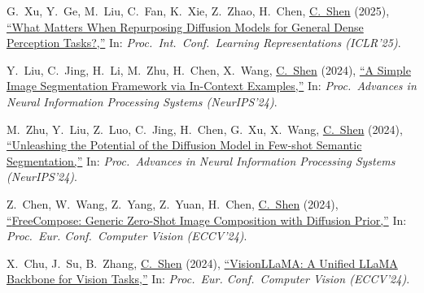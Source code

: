 \documentclass[9pt, a4paper]{article}
\newcommand{\years}[1]{\marginnote{\scriptsize #1}}
\def\highlight{\uline}
\begin{document}
\medskip

\years{2025} G.~Xu, Y.~Ge, M.~Liu, C.~Fan, K.~Xie, Z.~Zhao, H.~Chen, \highlight{C.~Shen} (2025),
\href{http://www.google.com/search?lr=&ie=UTF-8&oe=UTF-8&q=What+Matters+When+Repurposing+Diffusion+Models+for+General+Dense+Perception+Tasks%3F+Guangkai+Xu%2C+Yongtao+Ge%2C+Mingyu+Liu%2C+Chengxiang+Fan%2C+Kangyang+Xie%2C+Zhiyue+Zhao%2C+Hao+Chen%2C+Chunhua+Shen}{``What Matters When Repurposing Diffusion Models for General Dense Perception Tasks?,{}''}
In: \emph{Proc.\ Int.\ Conf.\  Learning Representations (ICLR'25)}.

\medskip

\years{2024} Y.~Liu, C.~Jing, H.~Li, M.~Zhu, H.~Chen, X.~Wang, \highlight{C.~Shen} (2024),
\href{http://www.google.com/search?lr=&ie=UTF-8&oe=UTF-8&q=A+Simple+Image+Segmentation+Framework+via+In-Context+Examples+Yang+Liu%2C+Chenchen+Jing%2C+Hengtao+Li%2C+Muzhi+Zhu%2C+Hao+Chen%2C+Xinlong+Wang%2C+Chunhua+Shen}{``A Simple Image Segmentation Framework via In-Context Examples,{}''}
In: \emph{Proc.\ Advances in Neural Information Processing Systems (NeurIPS'24)}.

\medskip

\years{2024} M.~Zhu, Y.~Liu, Z.~Luo, C.~Jing, H.~Chen, G.~Xu, X.~Wang, \highlight{C.~Shen} (2024),
\href{http://www.google.com/search?lr=&ie=UTF-8&oe=UTF-8&q=Unleashing+the+Potential+of+the+Diffusion+Model+in+Few-shot+Semantic+Segmentation+Muzhi+Zhu%2C+Yang+Liu%2C+Zekai+Luo%2C+Chenchen+Jing%2C+Hao+Chen%2C+Guangkai+Xu%2C+Xinlong+Wang%2C+Chunhua+Shen}{``Unleashing the Potential of the Diffusion Model in Few-shot Semantic Segmentation,{}''}
In: \emph{Proc.\ Advances in Neural Information Processing Systems (NeurIPS'24)}.

\medskip

\years{2024} Z.~Chen, W.~Wang, Z.~Yang, Z.~Yuan, H.~Chen, \highlight{C.~Shen} (2024),
\href{http://www.google.com/search?lr=&ie=UTF-8&oe=UTF-8&q=FreeCompose%3A+Generic+Zero-Shot+Image+Composition+with+Diffusion+Prior+Zhekai+Chen%2C+Wen+Wang%2C+Zhen+Yang%2C+Zeqing+Yuan%2C+Hao+Chen%2C+Chunhua+Shen}{``{FreeCompose}: Generic Zero-Shot Image Composition with Diffusion Prior,{}''}
In: \emph{Proc.\ Eur. Conf.\  Computer Vision (ECCV'24)}.

\medskip

\years{2024} X.~Chu, J.~Su, B.~Zhang, \highlight{C.~Shen} (2024),
\href{http://www.google.com/search?lr=&ie=UTF-8&oe=UTF-8&q=VisionLLaMA%3A+A+Unified+LLaMA+Backbone+for+Vision+Tasks+Xiangxiang+Chu%2C+Jianlin+Su%2C+Bo+Zhang%2C+Chunhua+Shen}{``{VisionLLaMA}: A Unified LLaMA Backbone for Vision Tasks,{}''}
In: \emph{Proc.\ Eur. Conf.\  Computer Vision (ECCV'24)}.
\end{document}
